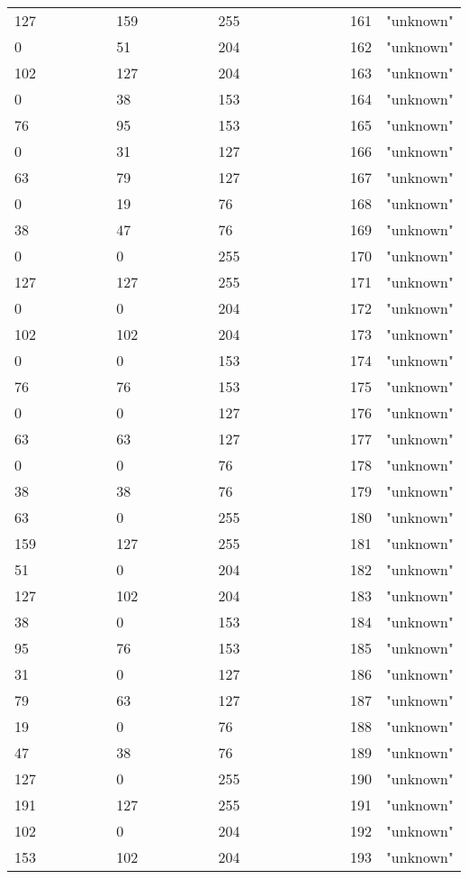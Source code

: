 \begin{longtable}{p{0.3\linewidth} p{0.3\linewidth} p{0.4\linewidth}}
127 &  159 &  255 &  161 &  "unknown"\\
  0 &   51 &  204 &  162 &  "unknown"\\
102 &  127 &  204 &  163 &  "unknown"\\
  0 &   38 &  153 &  164 &  "unknown"\\
 76 &   95 &  153 &  165 &  "unknown"\\
  0 &   31 &  127 &  166 &  "unknown"\\
 63 &   79 &  127 &  167 &  "unknown"\\
  0 &   19 &   76 &  168 &  "unknown"\\
 38 &   47 &   76 &  169 &  "unknown"\\
  0 &    0 &  255 &  170 &  "unknown"\\
127 &  127 &  255 &  171 &  "unknown"\\
  0 &    0 &  204 &  172 &  "unknown"\\
102 &  102 &  204 &  173 &  "unknown"\\
  0 &    0 &  153 &  174 &  "unknown"\\
 76 &   76 &  153 &  175 &  "unknown"\\
  0 &    0 &  127 &  176 &  "unknown"\\
 63 &   63 &  127 &  177 &  "unknown"\\
  0 &    0 &   76 &  178 &  "unknown"\\
 38 &   38 &   76 &  179 &  "unknown"\\
 63 &    0 &  255 &  180 &  "unknown"\\
159 &  127 &  255 &  181 &  "unknown"\\
 51 &    0 &  204 &  182 &  "unknown"\\
127 &  102 &  204 &  183 &  "unknown"\\
 38 &    0 &  153 &  184 &  "unknown"\\
 95 &   76 &  153 &  185 &  "unknown"\\
 31 &    0 &  127 &  186 &  "unknown"\\
 79 &   63 &  127 &  187 &  "unknown"\\
 19 &    0 &   76 &  188 &  "unknown"\\
 47 &   38 &   76 &  189 &  "unknown"\\
127 &    0 &  255 &  190 &  "unknown"\\
191 &  127 &  255 &  191 &  "unknown"\\
102 &    0 &  204 &  192 &  "unknown"\\
153 &  102 &  204 &  193 &  "unknown"\\

\end{longtable}
